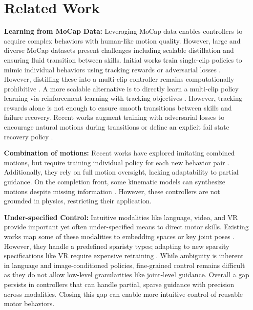 \section{Related Work}
\label{sec:related}
\textbf{Learning from MoCap Data:} Leveraging MoCap data enables controllers to acquire complex behaviors with human-like motion quality. However, large and diverse MoCap datasets present challenges including scalable distillation and ensuring fluid transition between skills. Initial works train single-clip policies to mimic individual behaviors using tracking rewards \cite{peng_deepmimic_2018, Chentanez2018PhysicsbasedMC, ren_diffmimic_2023} or adversarial losses \cite{peng_amp_2021, Ho2016GenerativeAI, Lee2022HumaninspiredVI, Merel2017LearningHB, Xu2021AGA}. However, distilling these into a multi-clip controller remains computationally prohibitive \cite{wagener_mocapact_2023}. A more scalable alternative is to directly learn a multi-clip policy learning via reinforcement learning with tracking objectives \cite{Won2022PhysicsbasedCC, Won2020ASA, luo_perpetual_2023, Merel2018NeuralPM, Dou2023CASELC, wagener_mocapact_2023, Peng2022ASE}. However, tracking rewards alone is not enough to ensure smooth transitions between skills and failure recovery. Recent works augment training with adversarial losses to encourage natural motions during transitions \cite{Peng2022ASE, Tessler2023CALMCA} or define an explicit fail state recovery policy \cite{luo_perpetual_2023}. 

\textbf{Combination of motions:} Recent works have explored imitating combined motions, but require training individual policy for each new behavior pair \cite{Bae2023PMPLT, Xu2023CompositeML, Lee2022LearningVC}. Additionally, they rely on full motion oversight, lacking adaptability to partial guidance. On the completion front, some kinematic models can synthesize motions despite missing information \cite{Wang2020SynthesizingL3, Chen2022ExecutingYC}. However, these controllers are not grounded in physics, restricting their application.

\textbf{Under-specified Control:} Intuitive modalities like language, video, and VR provide important yet often under-specified means to direct motor skills. Existing works map some of these modalities to embedding spaces \cite{Juravsky2022PADLLP, Yao2023MoConVQUP, Lee2022HumaninspiredVI, Sun2023PromptPP} or key joint poses \cite{luo_perpetual_2023, Luo2023UniversalHM}. However, they handle a predefined sparisty types; adapting to new sparsity specifications like VR require expensive retraining \cite{Cern2023ANM, Du2023AvatarsGL}. While ambiguity is inherent in language and image-conditioned policies\cite{Huang2022PhysicallyPA, Yao2023MoConVQUP}, fine-grained control remains difficult as they do not allow low-level granularities like joint-level guidance. Overall a gap persists in controllers that can handle partial, sparse guidance with precision across modalities. Closing this gap can enable more intuitive control of reusable motor behaviors.

